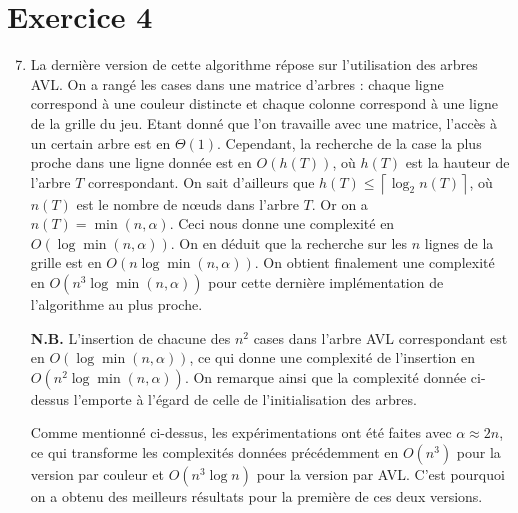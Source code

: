\documentclass[12pt,a4paper]{article}
\begin{document}
\section{Exercice 4}
\begin{enumerate}
\setcounter{enumi}{6}
\item La derni\`ere version de cette algorithme r\'epose sur l'utilisation des 
arbres AVL. On a rang\'e les cases dans une matrice d'arbres : chaque ligne 
correspond \`a une couleur distincte et chaque colonne correspond \`a une ligne 
de la grille du jeu. Etant donn\'e que l'on travaille avec une matrice, 
l'acc\`es \`a un certain arbre est en $\Theta(1)$. Cependant, la recherche de 
la case la plus proche dans une ligne donn\'ee est en $O(h(T))$, o\`u $h(T)$ 
est la hauteur de l'arbre $T$ correspondant. On sait d'ailleurs que $h(T) \leq 
\left \lceil \log_2 n(T) \right \rceil$, o\`u $n(T)$ est le nombre de 
n\oe uds dans l'arbre $T$. Or on a $n(T) = \min(n,\alpha)$. 
Ceci nous donne une complexit\'e en $O(\log \min(n,\alpha))$. On en d\'eduit 
que la recherche sur les $n$ lignes de la grille est en $O(n\log 
\min(n,\alpha))$. On obtient finalement une complexit\'e en $O(n^3\log 
\min(n,\alpha))$ pour cette derni\`ere impl\'ementation de l'algorithme au plus 
proche.

{\bfseries N.B.} L'insertion de chacune des $n^2$ cases dans l'arbre 
AVL correspondant est en $O(\log \min(n,\alpha))$, ce qui donne une 
complexit\'e de l'insertion en $O(n^2\log \min(n,\alpha))$. On remarque ainsi 
que la complexit\'e donn\'ee ci-dessus l'emporte \`a l'\'egard de celle de 
l'initialisation des arbres. \par
Comme mentionn\'e ci-dessus, les exp\'erimentations ont \'et\'e faites avec 
$\alpha \approx 2n$, ce qui transforme les complexit\'es donn\'ees 
pr\'ec\'edemment en $O(n^3)$ pour la version par couleur et $O(n^3\log n)$ pour 
la version par AVL. C'est pourquoi on a obtenu des meilleurs r\'esultats pour 
la premi\`ere de ces deux versions.
\end{enumerate}
\end{document}
